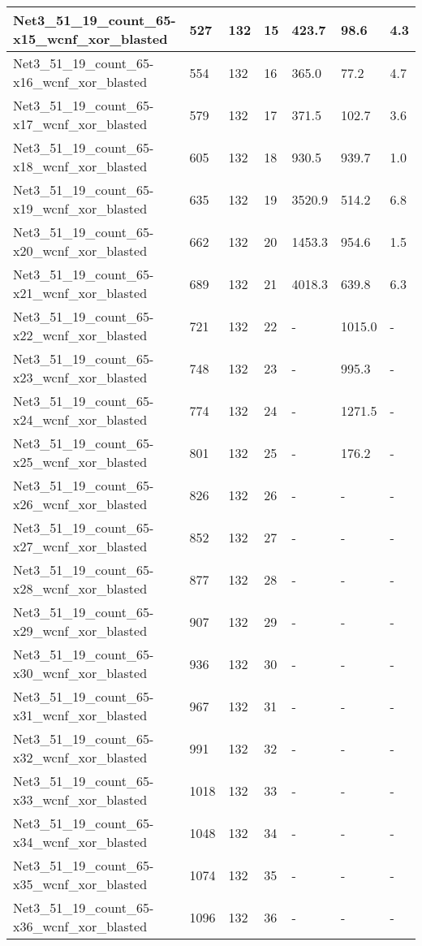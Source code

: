 \begin{scriptsize}
\begin{longtable}{|p{5cm}|l|l|l|l|l|l|}
Net3\_51\_19\_count\_65-x15\_wcnf\_xor\_blasted&527&132&15&423.7&98.6&4.3 \\ \hline 
Net3\_51\_19\_count\_65-x16\_wcnf\_xor\_blasted&554&132&16&365.0&77.2&4.7 \\ \hline 
Net3\_51\_19\_count\_65-x17\_wcnf\_xor\_blasted&579&132&17&371.5&102.7&3.6 \\ \hline 
Net3\_51\_19\_count\_65-x18\_wcnf\_xor\_blasted&605&132&18&930.5&939.7&1.0 \\ \hline 
Net3\_51\_19\_count\_65-x19\_wcnf\_xor\_blasted&635&132&19&3520.9&514.2&6.8 \\ \hline 
Net3\_51\_19\_count\_65-x20\_wcnf\_xor\_blasted&662&132&20&1453.3&954.6&1.5 \\ \hline 
Net3\_51\_19\_count\_65-x21\_wcnf\_xor\_blasted&689&132&21&4018.3&639.8&6.3 \\ \hline 
Net3\_51\_19\_count\_65-x22\_wcnf\_xor\_blasted&721&132&22&-&1015.0&- \\ \hline 
Net3\_51\_19\_count\_65-x23\_wcnf\_xor\_blasted&748&132&23&-&995.3&- \\ \hline 
Net3\_51\_19\_count\_65-x24\_wcnf\_xor\_blasted&774&132&24&-&1271.5&- \\ \hline 
Net3\_51\_19\_count\_65-x25\_wcnf\_xor\_blasted&801&132&25&-&176.2&- \\ \hline 
Net3\_51\_19\_count\_65-x26\_wcnf\_xor\_blasted&826&132&26&-&-&- \\ \hline 
Net3\_51\_19\_count\_65-x27\_wcnf\_xor\_blasted&852&132&27&-&-&- \\ \hline 
Net3\_51\_19\_count\_65-x28\_wcnf\_xor\_blasted&877&132&28&-&-&- \\ \hline 
Net3\_51\_19\_count\_65-x29\_wcnf\_xor\_blasted&907&132&29&-&-&- \\ \hline 
Net3\_51\_19\_count\_65-x30\_wcnf\_xor\_blasted&936&132&30&-&-&- \\ \hline 
Net3\_51\_19\_count\_65-x31\_wcnf\_xor\_blasted&967&132&31&-&-&- \\ \hline 
Net3\_51\_19\_count\_65-x32\_wcnf\_xor\_blasted&991&132&32&-&-&- \\ \hline 
Net3\_51\_19\_count\_65-x33\_wcnf\_xor\_blasted&1018&132&33&-&-&- \\ \hline 
Net3\_51\_19\_count\_65-x34\_wcnf\_xor\_blasted&1048&132&34&-&-&- \\ \hline 
Net3\_51\_19\_count\_65-x35\_wcnf\_xor\_blasted&1074&132&35&-&-&- \\ \hline 
Net3\_51\_19\_count\_65-x36\_wcnf\_xor\_blasted&1096&132&36&-&-&- \\ \hline 

\end{longtable}
\end{scriptsize}
